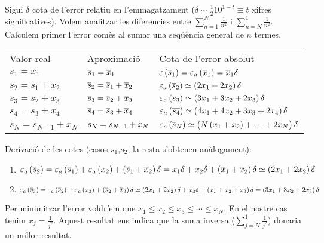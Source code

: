 \begin{example}
  Sigui $\delta$ cota de l'error relatiu en l'emmagatzament ($\delta \sim \frac{1}{2}10^{1-t} \equiv t$ xifres significatives). Volem analitzar les diferencies entre $\sum_{n=1}^{N}\frac{1}{n^2}$ i $\sum_{n=N}^{1}\frac{1}{n^2}$. Calculem primer l'error comès al sumar una seqüència general de $n$ termes.
  \begin{table}[H]
	  \centering
	  \label{no-asociativa}
	  \begin{tabular}{lll}
		  Valor real & Aproximació & Cota de l'error absolut \\
		  $s_1 = x_ 1$ & $\overline{s}_1 = \overline{x}_1$ & $\varepsilon\left( \overline{s}_1\right)  = \varepsilon_a\left( \overline{x}_1\right)  = \overline{x}_1\delta$ \\
		  $s_2 = s_1 + x_ 2$ & $\overline{s}_2 = \overline{s}_1 + \overline{x}_2$  &   $\varepsilon_a\left( \overline{s}_2\right)  \simeq \left( 2x_1 + 2x_2\right) \delta$  \\
		  $s_3 = s_2 + x_3$ & $\overline{s}_3 = \overline{s}_2 + \overline{x}_3$   &   $\varepsilon_a\left( \overline{s}_3\right)  \simeq \left( 3x_1 + 3x_2 + 2x_3\right) \delta$\\
		  $s_4 = s_3 + x_4$ & $\overline{s}_4 = \overline{s}_3 + \overline{x}_4$   &   $\varepsilon_a\left( \overline{s_4}\right)  \simeq \left( 4x_1 + 4x_2 + 3x_3 + 2x_4\right) \delta$ \\
		  $s_N = s_{N-1} + x_N$ & $\overline{s}_N = \overline{s}_{N-1} + \overline{x}_N$ & $\varepsilon_a\left( \overline{s}_N\right)  \simeq \left( N\left( x_1 +x_2\right) + \cdots + 2x_N\right) \delta$
	  \end{tabular}
  \end{table}

  Derivació de les cotes (casos $s_1$,$s_2$; la resta s'obtenen anàlogament):

  \begin{enumerate}[1)]
	  \item $\varepsilon_a\left( \overline{s}_2\right)  = \varepsilon_a\left( \overline{s}_1\right)  + \varepsilon_a\left( x_2\right)  + \left( \overline{s}_1 + \overline{x}_2\right) \delta = x_1\delta + x_2\delta + \left( \overline{x}_1 + \overline{x}_2\right) \delta \simeq \left( 2x_1 + 2x_2\right) \delta $
	  \item $\varepsilon_a\left( \overline{s}_3\right)  = \varepsilon_a\left( \overline{s}_2\right)  + \varepsilon_a\left( x_3\right)  + \left( \overline{s}_2 + \overline{x}_3\right) \delta \simeq \left( 2x_1 + 2x_2\right) \delta + x_3\delta + \left( x_1 + x_2 + x_3\right) \delta = \left( 3x_1 + 3x_2 + 2x_3\right) \delta $
  \end{enumerate}
  
  Per minimitzar l'error voldríem que $x_1 \leq x_ 2 \leq x_3 \leq \cdots \leq x_N$. En el nostre cas tenim $x_j = \frac{1}{j^2}$. Aquest resultat ens indica que la suma inversa ($\sum_{j=N}^{1}\frac{1}{j^2}$)  donaria un millor resultat.
\end{example}